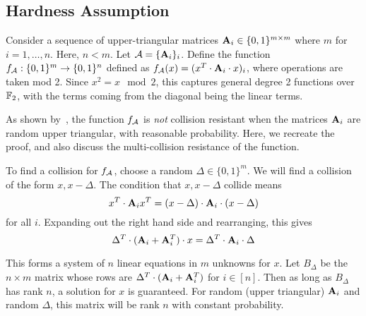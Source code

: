 \label{sec:constr}

\subsection{Hardness Assumption}

Consider a sequence of upper-triangular matrices ${\mathbf{A}}_i\in\{0,1\}^{m\times m}$ where $m$ for $i=1,\dots,n$.  Here, $n<m$.  Let ${\mathcal{A}}=\{{\mathbf{A}}_i\}_i$.  Define the function $f_{\mathcal{A}}:\{0,1\}^m\rightarrow\{0,1\}^n$ defined as $f_{\mathcal{A}}(x)=(x^T\cdot{\mathbf{A}}_i\cdot x)_i$, where operations are taken mod 2.  Since $x^2=x\mod 2$, this captures general degree 2 functions over ${\mathbb F}_2$, with the terms coming from the diagonal being the linear terms.

As shown by~\cite{DingYang08,ITCS:AHIKV17}, the function $f_{\mathcal{A}}$ is \emph{not} collision resistant when the matrices ${\mathbf{A}}_i$ are random upper triangular, with reasonable probability.  Here, we recreate the proof, and also discuss the multi-collision resistance of the function.

To find a collision for $f_{\mathcal{A}}$, choose a random $\Delta\in\{0,1\}^m$.  We will find a collision of the form $x,x-\Delta$.  The condition that $x,x-\Delta$ collide means \[x^T\cdot{\mathbf{A}}_i x^T = (x-\Delta)\cdot {\mathbf{A}}_i\cdot (x-\Delta)\]
for all $i$.  Expanding out the right hand side and rearranging, this gives
\[\Delta^T\cdot ({\mathbf{A}}_i+{\mathbf{A}}_i^T)\cdot x = \Delta^T\cdot{\mathbf{A}}_i\cdot\Delta\]

This forms a system of $n$ linear equations in $m$ unknowns for $x$.  Let $B_\Delta$ be the $n\times m$ matrix whose rows are $\Delta^T\cdot({\mathbf{A}}_i+{\mathbf{A}}_i^T)$ for $i\in[n]$.  Then as long as $B_\Delta$ has rank $n$, a solution for $x$ is guaranteed.  For random (upper triangular) ${\mathbf{A}}_i$ and random $\Delta$, this matrix will be rank $n$ with constant probability.

